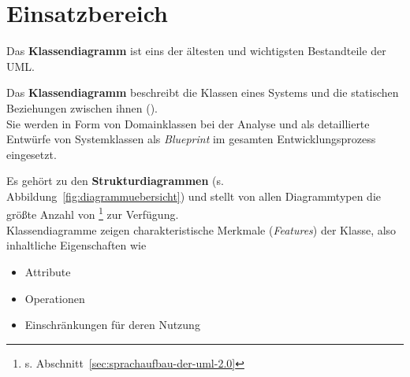 \section{Einsatzbereich}

Das \textbf{Klassendiagramm} ist eins der ältesten und wichtigsten Bestandteile der UML.

\vspace{2mm}
\begin{tcolorbox}[title=Klassendiagramm]
    Das \textbf{Klassendiagramm} beschreibt die Klassen eines Systems und die statischen Beziehungen zwischen ihnen (\cite[17]{Buh09}).\\
    Sie werden in Form von Domainklassen bei der Analyse und als detaillierte Entwürfe von Systemklassen als \textit{Blueprint} im gesamten Entwicklungsprozess eingesetzt.
\end{tcolorbox}
\vspace{2mm}

\noindent
Es gehört zu den \textbf{Strukturdiagrammen} (s. Abbildung~\ref{fig:diagrammuebersicht}) und stellt von allen Diagrammtypen die größte Anzahl von \footnote{s. Abschnitt~\ref{sec:sprachaufbau-der-uml-2.0}} zur Verfügung.\\

\noindent
Klassendiagramme zeigen charakteristische Merkmale (\textit{Features}) der Klasse, also inhaltliche Eigenschaften wie

\begin{itemize}
    \item Attribute
    \item Operationen
    \item Einschränkungen für deren Nutzung
\end{itemize}